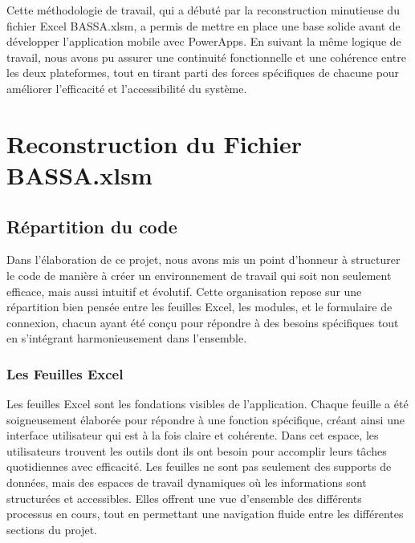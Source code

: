 \documentclass[a4paper, oneside, 12pt, final]{extreport}
\begin{document}
Cette méthodologie de travail, qui a débuté par la reconstruction minutieuse du fichier Excel BASSA.xlsm, a permis de mettre en place une base solide avant de développer l'application mobile avec PowerApps. En suivant la même logique de travail, nous avons pu assurer une continuité fonctionnelle et une cohérence entre les deux plateformes, tout en tirant parti des forces spécifiques de chacune pour améliorer l'efficacité et l'accessibilité du système.


\newpage
\part{Reconstruction du Fichier BASSA.xlsm }
\chapter{Répartition du code}
Dans l'élaboration de ce projet, nous avons mis un point d'honneur à structurer le code de manière à créer un environnement de travail qui soit non seulement efficace, mais aussi intuitif et évolutif. Cette organisation repose sur une répartition bien pensée entre les feuilles Excel, les modules, et le formulaire de connexion, chacun ayant été conçu pour répondre à des besoins spécifiques tout en s'intégrant harmonieusement dans l'ensemble.

\section{Les Feuilles Excel}
Les feuilles Excel sont les fondations visibles de l'application. Chaque feuille a été soigneusement élaborée pour répondre à une fonction spécifique, créant ainsi une interface utilisateur qui est à la fois claire et cohérente. Dans cet espace, les utilisateurs trouvent les outils dont ils ont besoin pour accomplir leurs tâches quotidiennes avec efficacité. Les feuilles ne sont pas seulement des supports de données, mais des espaces de travail dynamiques où les informations sont structurées et accessibles. Elles offrent une vue d'ensemble des différents processus en cours, tout en permettant une navigation fluide entre les différentes sections du projet.
\end{document}
